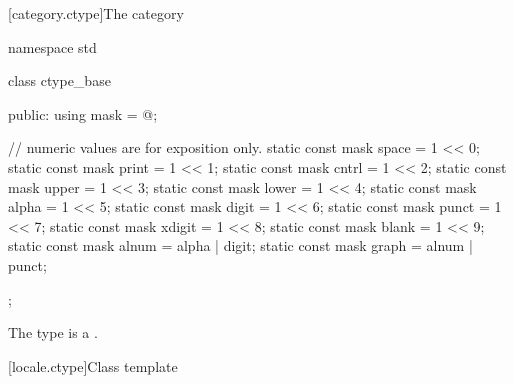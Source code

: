 [category.ctype]{The  category}

%
\begin{codeblock}
namespace std {
  class ctype_base {
  public:
    using mask = @\seebelow@;

    // numeric values are for exposition only.
    static const mask space  = 1 << 0;
    static const mask print  = 1 << 1;
    static const mask cntrl  = 1 << 2;
    static const mask upper  = 1 << 3;
    static const mask lower  = 1 << 4;
    static const mask alpha  = 1 << 5;
    static const mask digit  = 1 << 6;
    static const mask punct  = 1 << 7;
    static const mask xdigit = 1 << 8;
    static const mask blank  = 1 << 9;
    static const mask alnum  = alpha | digit;
    static const mask graph  = alnum | punct;
  };
}
\end{codeblock}

\pnum
The type
is a .

[locale.ctype]{Class template }

